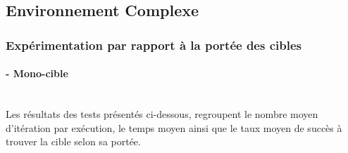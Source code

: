 
\subsection{Environnement Complexe}
\subsubsection{Expérimentation par rapport à la portée des cibles}

\paragraph{- Mono-cible}
\textbf{ }\\
Les résultats des tests présentés ci-dessous, regroupent le nombre moyen d'itération par exécution, le temps moyen ainsi que le taux moyen de succès à trouver la cible selon sa portée.

